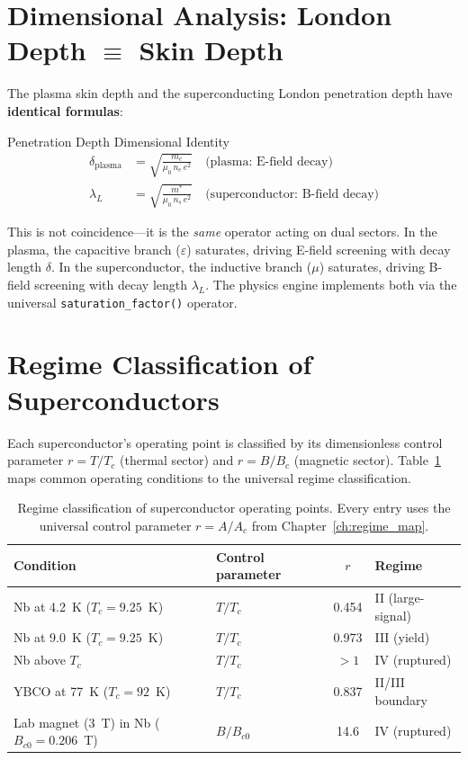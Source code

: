 \section{Dimensional Analysis: London Depth $\equiv$ Skin Depth}
\label{sec:london_skin_identity}

The plasma skin depth and the superconducting London penetration depth have \textbf{identical formulas}:
\begin{resultbox}{Penetration Depth Dimensional Identity}
\begin{align}
    \delta_{\text{plasma}} &= \sqrt{\frac{m_e}{\mu_0\, n_e\, e^2}}
    \quad \text{(plasma: E-field decay)} \\[4pt]
    \lambda_L &= \sqrt{\frac{m^*}{\mu_0\, n_s\, e^2}}
    \quad \text{(superconductor: B-field decay)}
\end{align}
\end{resultbox}

This is not coincidence---it is the \textit{same} operator acting on dual sectors.  In the plasma, the capacitive branch ($\varepsilon$) saturates, driving E-field screening with decay length $\delta$.  In the superconductor, the inductive branch ($\mu$) saturates, driving B-field screening with decay length $\lambda_L$.  The physics engine implements both via the universal \texttt{saturation\_factor()} operator.

\section{Regime Classification of Superconductors}
\label{sec:sc_regime_classification}

Each superconductor's operating point is classified by its dimensionless control parameter $r = T/T_c$ (thermal sector) and $r = B/B_c$ (magnetic sector).  Table~\ref{tab:sc_regime} maps common operating conditions to the universal regime classification.

\begin{table}[H]
\centering\small
\caption{Regime classification of superconductor operating points.  Every entry uses the universal control parameter $r = A/A_c$ from Chapter~\ref{ch:regime_map}.}
\label{tab:sc_regime}
\begin{tabular}{llcl}
\toprule
\textbf{Condition} & \textbf{Control parameter} & \textbf{$r$} & \textbf{Regime} \\
\midrule
Nb at 4.2~K ($T_c = 9.25$~K)     & $T/T_c$   & 0.454 & II (large-signal) \\
Nb at 9.0~K ($T_c = 9.25$~K)     & $T/T_c$   & 0.973 & III (yield) \\
Nb above $T_c$                    & $T/T_c$   & $>1$  & IV (ruptured) \\
YBCO at 77~K ($T_c = 92$~K)      & $T/T_c$   & 0.837 & II/III boundary \\
Lab magnet (3~T) in Nb ($B_{c0} = 0.206$~T) & $B/B_{c0}$ & 14.6 & IV (ruptured) \\
\bottomrule
\end{tabular}
\end{table}

